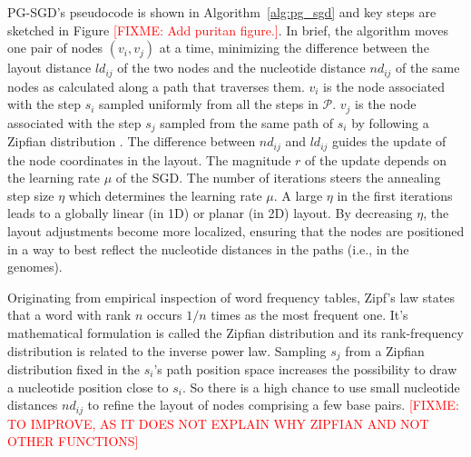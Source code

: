 \documentclass{bioinfo}
\theoremstyle{definition}
\newcommand{\red}[1]{{\textcolor{Red}{#1}}}
\newcommand{\FIXME}[1]{\red{[FIXME: #1]}}
\begin{document}
	PG-SGD's pseudocode is shown in Algorithm~\ref{alg:pg_sgd} and key steps are sketched in Figure \FIXME{Add puritan figure.}.
	In brief, the algorithm moves one pair of nodes $( v_i, v_j )$ at a time, minimizing the difference between the layout distance $ld_{ij}$ of the two nodes and the nucleotide distance $nd_{ij}$ of the same nodes as calculated along a path that traverses them.
	$v_i$ is the node associated with the step $s_i$ sampled uniformly from all the steps in $\mathcal{P}$.
	$v_j$ is the node associated with the step $s_j$ sampled from the same path of $s_i$ by following a Zipfian distribution \citep{Zipf1932}.
	The difference between $nd_{ij}$ and $ld_{ij}$ guides the update of the node coordinates in the layout.
	The magnitude $r$ of the update depends on the learning rate $\mu$ of the SGD.
	The number of iterations steers the annealing step size $\eta$ which determines the learning rate $\mu$.
	A large $\eta$ in the first iterations leads to a globally linear (in 1D) or planar (in 2D) layout.
	By decreasing $\eta$, the layout adjustments become more localized, ensuring that the nodes are positioned in a way to best reflect the nucleotide distances in the paths (i.e., in the genomes). %
	
	


	Originating from empirical inspection of word frequency tables, Zipf's law states that a word with rank $n$ occurs $1/n$ times as the most frequent one.
	It's mathematical formulation is called the Zipfian distribution and its rank-frequency distribution is related to the inverse power law.
	Sampling $s_j$ from a Zipfian distribution fixed in the $s_i$'s path position space increases the possibility to draw a nucleotide position close to $s_i$.
	So there is a high chance to use small nucleotide distances $nd_{ij}$ to refine the layout of nodes comprising a few base pairs.
	\FIXME{TO IMPROVE, AS IT DOES NOT EXPLAIN WHY ZIPFIAN AND NOT OTHER FUNCTIONS}
\end{document}
